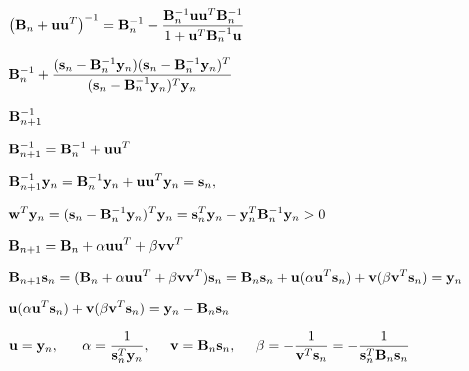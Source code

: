 \documentclass{article}
\def\lthtmlcheckvsize{\ifdim\ht\sizebox<\vsize 
  \ifdim\wd\sizebox<\hsize\expandafter\hfill\fi \expandafter\vfill
  \else\expandafter\vss\fi}%
\begin{document}
{\newpage\clearpage
{}%
$\displaystyle \left( {\bf B}_n+{\bf uu}^T \right)^{-1}
={\bf B}_n^{-1}-\frac{ {\bf B}_n^{-1}{\bf uu}^T{\bf B}_n^{-1}}{1+{\bf u}^T{\bf B}_n^{-1}{\bf u}}$%
\lthtmlindisplaymathZ
\lthtmlcheckvsize\clearpage}

{\newpage\clearpage
{}%
$\displaystyle {\bf B}_n^{-1}
+\frac{ ({\bf s}_n-{\bf B}_n^{-1}{\bf y}_n)({\bf s}_n-{\bf B}_n^{-1}{\bf y}_n)^T }
{ ({\bf s}_n-{\bf B}_n^{-1}{\bf y}_n)^T {\bf y}_n }$%
\lthtmlindisplaymathZ
\lthtmlcheckvsize\clearpage}

{\newpage\clearpage
{}%
$ {\bf B}_{n+1}^{-1}$%
\lthtmlindisplaymathZ
\lthtmlcheckvsize\clearpage}

{\newpage\clearpage
{}%
$\displaystyle {\bf B}_{n+1}^{-1}={\bf B}_n^{-1}+{\bf uu}^T$%
\lthtmlindisplaymathZ
\lthtmlcheckvsize\clearpage}

{\newpage\clearpage
{}%
$\displaystyle {\bf B}_{n+1}^{-1}{\bf y}_n
={\bf B}_n^{-1}{\bf y}_n+{\bf uu}^T{\bf y}_n={\bf s}_n,$%
\lthtmlindisplaymathZ
\lthtmlcheckvsize\clearpage}

{\newpage\clearpage
{}%
$\displaystyle {\bf w}^T{\bf y}_n=({\bf s}_n-{\bf B}_n^{-1}{\bf y}_n)^T {\bf y}_n
={\bf s}_n^T{\bf y}_n -{\bf y}_n^T {\bf B}_n^{-1}{\bf y}_n >0$%
\lthtmlindisplaymathZ
\lthtmlcheckvsize\clearpage}

{\newpage\clearpage
{}%
$\displaystyle {\bf B}_{n+1}={\bf B}_n+\alpha{\bf uu}^T+\beta{\bf vv}^T$%
\lthtmlindisplaymathZ
\lthtmlcheckvsize\clearpage}

{\newpage\clearpage
{}%
$\displaystyle {\bf B}_{n+1} {\bf s}_n
=({\bf B}_n+\alpha{\bf uu}^T+\beta{\bf vv}^T){\bf s}_n
={\bf B}_n{\bf s}_n+{\bf u}(\alpha{\bf u}^T{\bf s}_n)
+{\bf v}(\beta{\bf v}^T{\bf s}_n)={\bf y}_n$%
\lthtmlindisplaymathZ
\lthtmlcheckvsize\clearpage}

{\newpage\clearpage
{}%
$\displaystyle {\bf u}(\alpha{\bf u}^T{\bf s}_n)
+{\bf v}(\beta{\bf v}^T{\bf s}_n)={\bf y}_n-{\bf B}_n{\bf s}_n$%
\lthtmlindisplaymathZ
\lthtmlcheckvsize\clearpage}

{\newpage\clearpage
{}%
$\displaystyle {\bf u}={\bf y}_n,\;\;\;\;\;\;\alpha=\frac{1}{{\bf s}_n^T{\bf y}_n},
\;\;\;\;\;{\bf v}={\bf B}_n{\bf s}_n,\;\;\;\;\;
\beta=-\frac{1}{{\bf v}^T{\bf s}_n}=-\frac{1}{{\bf s}_n^T{\bf B}_n{\bf s}_n}$%
\lthtmlindisplaymathZ
\lthtmlcheckvsize\clearpage}
\end{document}
